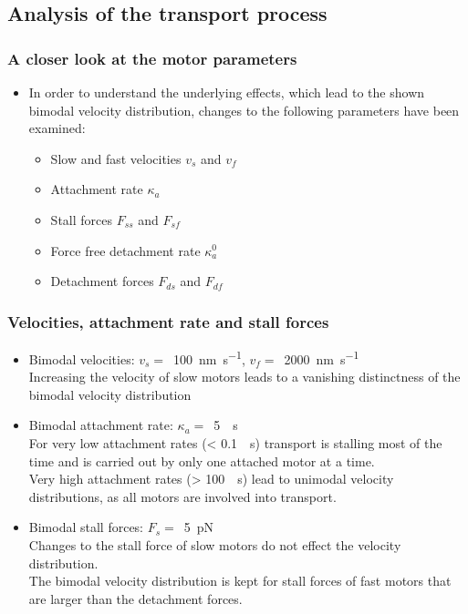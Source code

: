 \documentclass[11pt]{beamer}
\begin{document}
\subsection{Analysis of the transport process}
\begin{frame}
 \frametitle{A closer look at the motor parameters}
 \begin{itemize}
  \item
    In order to understand the underlying effects, which lead to the shown bimodal velocity distribution, changes to the following parameters have been examined:
    \pause
    \begin{itemize}
     \item Slow and fast velocities $v_s$ and $v_f$ \pause
     \item Attachment rate $\kappa_a$ \pause
     \item Stall forces $F_{ss}$ and $F_{sf}$ \pause
     \item Force free detachment rate $\kappa_a^0$ \pause
     \item Detachment forces $F_{ds}$ and $F_{df}$
    \end{itemize}

 \end{itemize} 
\end{frame}

\begin{frame}
 \frametitle{Velocities, attachment rate and stall forces}
 \begin{itemize}
  \item
    Bimodal velocities: \mbox{$v_s =$ \SI[per-mode=fraction]{100}{\nano\metre\per\second}}, \mbox{$v_f =$ \SI[per-mode=fraction]{2000}{\nano\metre\per\second}}\\
    Increasing the velocity of slow motors leads to a vanishing distinctness of the bimodal velocity distribution
    \pause
  \item
    Bimodal attachment rate: \mbox{$\kappa_a =$ \SI{5}{\per\second}}\\
    For very low attachment rates (< \SI{0.1}{\per\second}) transport is stalling most of the time and is carried out by only one attached motor at a time.\\
    Very high attachment rates (> \SI{100}{\per\second}) lead to unimodal velocity distributions, as all motors are involved into transport.
    \pause
  \item
    Bimodal stall forces: \mbox{$F_{s} =$ \SI{5}{\pico\newton}}\\
    Changes to the stall force of slow motors do not effect the velocity distribution.\\
    The bimodal velocity distribution is kept for stall forces of fast motors that are larger than the detachment forces.
 \end{itemize}

\end{frame}
\end{document}
